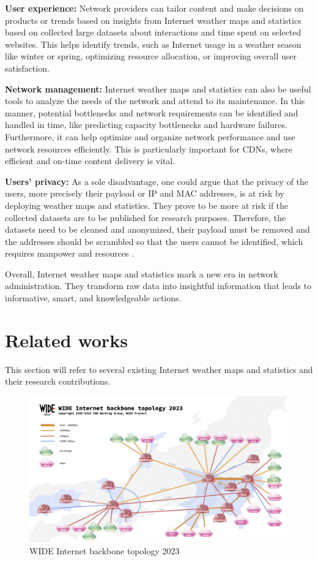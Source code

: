 \documentclass[sigconf,authorversion,nonacm]{acmart}
\begin{document}
\textbf{User experience:} Network providers can tailor content and make decisions on products or trends based on insights from Internet weather maps and statistics based on collected large datasets about interactions and time spent on selected websites. This helps identify trends, such as Internet usage in a weather season like winter or spring, optimizing resource allocation, or improving overall user satisfaction.

\textbf{Network management:} Internet weather maps and statistics can also be useful tools to analyze the needs of the network and attend to its maintenance. In this manner, potential bottlenecks and network requirements can be identified and handled in time, like predicting capacity bottlenecks and hardware failures. Furthermore, it can help optimize and organize network performance and use network resources efficiently. This is particularly important for CDNs, where efficient and on-time content delivery is vital. 

\textbf{Users' privacy:} As a sole disadvantage, one could argue that the privacy of the users, more precisely their payload or IP and MAC addresses, is at risk by deploying weather maps and statistics. They prove to be more at risk if the collected datasets are to be published for research purposes. Therefore, the datasets need to be cleaned and anonymized, their payload must be removed and the addresses should be scrambled so that the users cannot be identified, which requires manpower and resources \cite{271335}.

Overall, Internet weather maps and statistics mark a new era in network administration. They transform raw data into insightful information that leads to informative, smart, and knowledgeable actions.

\section{Related works}
This section will refer to several existing Internet weather maps and statistics and their research contributions.
\begin{figure}
    \centering
    \includegraphics[width=\linewidth]{MAWI/wide topology.png}
    \caption{WIDE Internet backbone topology 2023}
    \label{MAWI: WIDE Internet backbone topology 2023}
\end{figure}
\end{document}
